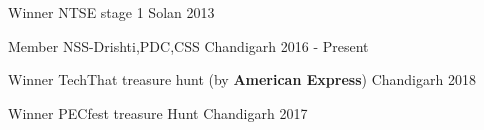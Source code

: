


\begin{cvhonors}


\cvhonor
{Winner} %
{NTSE stage 1} %
{Solan} %
{2013} %


\cvhonor
{Member} %
{NSS-Drishti,PDC,CSS} %
{Chandigarh} %
{2016 - Present} %



\cvhonor
{Winner} %
{TechThat treasure hunt (by \textbf{American Express})} %
{Chandigarh} %
{2018} %

\cvhonor
{Winner} %
{PECfest treasure Hunt} %
{Chandigarh} %
{2017} %


\end{cvhonors}
